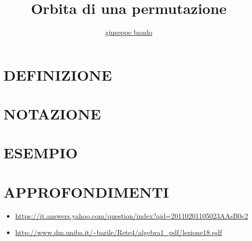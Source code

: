 \documentclass[a4paper,10pt]{article}
\title{Orbita di una permutazione}
\author{\href{http://www.baudo.hol.es}{giuseppe baudo}}
\begin{document}
\maketitle

\section{DEFINIZIONE}

\section{NOTAZIONE}

\section{ESEMPIO}

\section{APPROFONDIMENTI}
\begin{itemize}
 \item \url{https://it.answers.yahoo.com/question/index?qid=20110201105023AAsB0c2}
 \item \url{http://www.dm.uniba.it/~barile/Rete4/algebra1_pdf/lezione18.pdf}
 \end{itemize}
\end{document}
